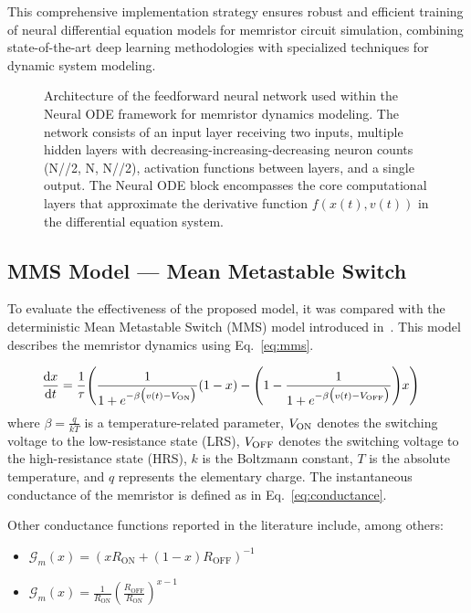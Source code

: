 \documentclass[11pt, oneside]{article}
\newcommand{\G}{\mathcal{G}}
\newcommand{\von}{V_{\rm ON}}
\newcommand{\voff}{V_{\rm OFF}}
\newcommand{\ua}{v}
\newcommand{\xw}{x}
\newcommand{\dert}[1]{\frac{{\rm d} {#1}}{{\rm d} t} }
\begin{document}
This comprehensive implementation strategy ensures robust and efficient training of neural differential equation models for memristor circuit simulation, combining state-of-the-art deep learning methodologies with specialized techniques for dynamic system modeling.


\begin{figure}[H]
    \centering
    \resizebox{\linewidth}{!}{%
        
    }
    \caption{Architecture of the feedforward neural network used within the Neural ODE framework for memristor dynamics modeling. The network consists of an input layer receiving two inputs, multiple hidden layers with decreasing-increasing-decreasing neuron counts (N//2, N, N//2), activation functions between layers, and a single output. The Neural ODE block encompasses the core computational layers that approximate the derivative function $f(\xw(t), \ua(t))$ in the differential equation system.}

    \label{fig:nn-arch}
\end{figure}


\subsection{MMS Model — Mean Metastable Switch}

To evaluate the effectiveness of the proposed model, it was compared with the deterministic Mean Metastable Switch (MMS) model introduced in~\cite{Molter2016, Ostrovskii2021}. This model describes the memristor dynamics using Eq.~\eqref{eq:mms}.


\begin{align}
    \label{eq:mms}
    \dert{x} & =  \frac{1}{\tau} \Bigg( \frac{1}{1+e^{-\beta \big(\ua(t)-\von\big)}} (1-x)  -\Bigg(1- \frac{1}{1+e^{-\beta \big(\ua(t)-\voff\big)}} \Bigg) x \Bigg)
\end{align}
where $\beta= \frac{q}{kT}$ is a temperature-related parameter, $\von$ denotes the switching voltage to the low-resistance state (LRS), $\voff$ denotes the switching voltage to the high-resistance state (HRS), $k$ is the Boltzmann constant, $T$ is the absolute temperature, and $q$ represents the elementary charge. The instantaneous conductance of the memristor is defined as in Eq.~\eqref{eq:conductance}.

Other conductance functions reported in the literature include, among others:
\begin{itemize}
    \item $\G_m(x) = \left( x R_{\mathrm{ON}} + (1 - x) R_{\mathrm{OFF}} \right)^{-1}$
    \item $\G_m(x) = \frac{1}{R_{\mathrm{ON}}} \left( \frac{R_{\mathrm{OFF}}}{R_{\mathrm{ON}}} \right)^{x-1}$
\end{itemize}
\end{document}
